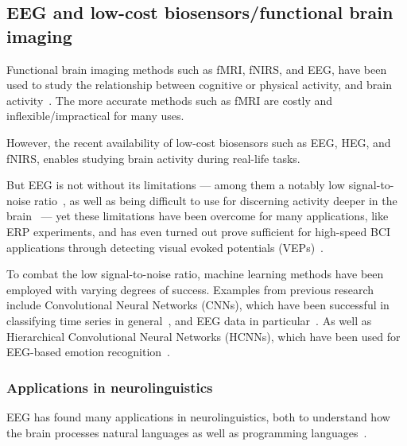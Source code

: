 \documentclass[a4paper]{article}
\begin{document}
\begin{refsection}

\subsection{EEG and low-cost biosensors/functional brain imaging}

    Functional brain imaging methods such as fMRI, fNIRS, and EEG, have been used to study the relationship between cognitive or physical activity, and brain activity~\cite{floyd_decoding_2017}\cite{hong_classification_2015}\cite{fucci_replication_2019}. The more accurate methods such as fMRI are costly and inflexible/impractical for many uses.

    However, the recent availability of low-cost biosensors such as EEG, HEG, and fNIRS, enables studying brain activity during real-life tasks.

    But EEG is not without its limitations --- among them a notably low signal-to-noise ratio~\cite{mcfarland_eeg-based_2017}, as well as being difficult to use for discerning activity deeper in the brain~\cite{fahimi_hnazaee_localization_2020} --- yet these limitations have been overcome for many applications, like ERP experiments, and has even turned out prove sufficient for high-speed BCI applications through detecting visual evoked potentials (VEPs)~\cite{spuler_high-speed_2017}.

    To combat the low signal-to-noise ratio, machine learning methods have been employed with varying degrees of success. Examples from previous research include Convolutional Neural Networks (CNNs), which have been successful in classifying time series in general~\cite{zhao_convolutional_2017}, and EEG data in particular~\cite{schirrmeister_deep_2017}. As well as Hierarchical Convolutional Neural Networks (HCNNs), which have been used for EEG-based emotion recognition~\cite{li_hierarchical_2018}.


    \subsubsection{Applications in neurolinguistics}

        EEG has found many applications in neurolinguistics, both to understand how the brain processes natural languages as well as programming languages~\cite{prat_relating_2020}.


\end{refsection}
\end{document}
